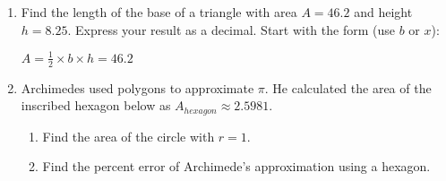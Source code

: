 \begin{enumerate}
\item Find the length of the base of a triangle with area $A=46.2$ and height $h=8.25$. Express your result as a decimal. Start with the form (use $b$ or $x$): \par \smallskip
$A = \frac{1}{2} \times b \times h = 46.2$
  \begin{flushright}
  \end{flushright}

\newpage
\item Archimedes used polygons to approximate $\pi$. He calculated the area of the inscribed hexagon below as $A_{hexagon} \approx 2.5981$.
\begin{multicols}{2}
  \raggedcolumns
  \begin{enumerate}[itemsep=2cm]
    \item Find the area of the circle with $r=1$.
    \item Find the percent error of Archimede's approximation using a hexagon.
  \end{enumerate}
  \begin{flushright}
  \end{flushright}
  \end{multicols}


\end{enumerate}

